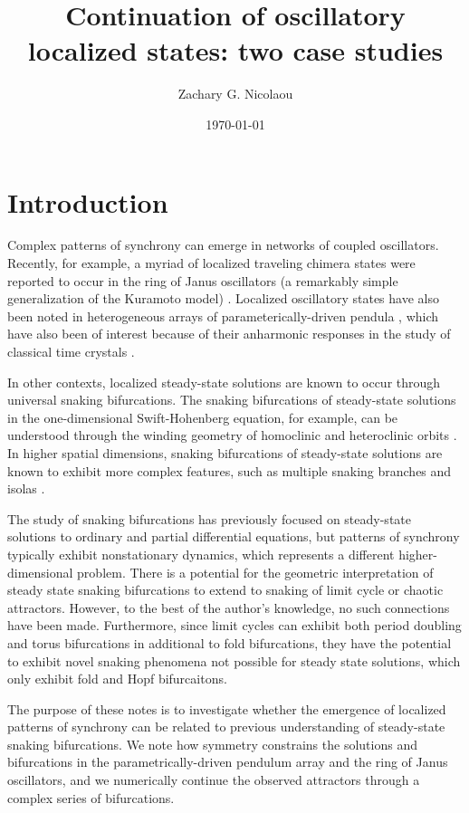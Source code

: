 \documentclass[aps,pre,amsmath,amssymb,floatfix,onecolumn,notitlepage,10pt]{revtex4-1}
\begin{document}
\title{Continuation of oscillatory localized states: two case studies}
\author{Zachary G. Nicolaou}
\date{\today}

\maketitle
\tableofcontents

\section{Introduction}
Complex patterns of synchrony can emerge in networks of coupled oscillators.  Recently, for example, a myriad of localized traveling chimera states were reported to occur in the ring of Janus oscillators (a remarkably simple generalization of the Kuramoto model) \cite{2019_Nicolaou}. Localized oscillatory states have also been noted in heterogeneous arrays of parameterically-driven pendula \cite{2021_Nicolaou_1}, which have also been of interest because of their anharmonic responses in the study of classical time crystals \cite{2021_Nicolaou_2}.  

In other contexts, localized steady-state solutions are known to occur through universal snaking bifurcations. The snaking bifurcations of steady-state solutions in the one-dimensional Swift-Hohenberg equation, for example, can be understood through the winding geometry of homoclinic and heteroclinic orbits \cite{2006_burke, 2009_beck}. In higher spatial dimensions, snaking bifurcations of steady-state solutions are known to exhibit  more complex features, such as multiple snaking branches and isolas \cite{2019_bramburger,2020_bramburger}.


The study of snaking bifurcations has previously focused on steady-state solutions to ordinary and partial differential equations, but patterns of synchrony typically exhibit nonstationary dynamics, which represents a different higher-dimensional problem.  There is a potential for the geometric interpretation of steady state snaking bifurcations to extend to snaking of limit cycle or chaotic attractors. However, to the best of the author's knowledge, no such connections have been made.  Furthermore, since limit cycles can exhibit both period doubling and torus bifurcations in additional to fold bifurcations, they have the potential to exhibit novel snaking phenomena not possible for steady state solutions, which only exhibit fold and Hopf bifurcaitons.  

The purpose of these notes is to investigate whether the emergence of localized patterns of synchrony can be related to previous understanding of steady-state snaking bifurcations. We note how symmetry constrains the solutions and bifurcations in the parametrically-driven pendulum array and the ring of Janus oscillators, and we numerically continue the observed attractors through a complex series of bifurcations. 
\end{document}
